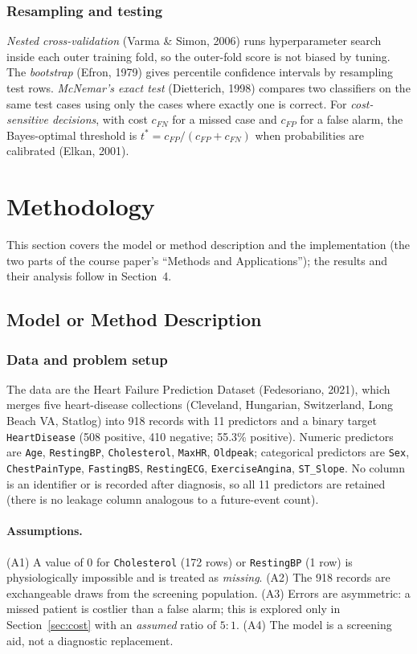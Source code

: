 \documentclass[12pt,a4paper]{article}
\newcommand{\code}[1]{\texttt{\small #1}}
\begin{document}
\subsubsection{Resampling and testing}
\emph{Nested cross-validation} (Varma \& Simon, 2006) runs hyperparameter search inside each outer training fold, so the outer-fold score is not biased by tuning. The \emph{bootstrap} (Efron, 1979) gives percentile confidence intervals by resampling test rows. \emph{McNemar's exact test} (Dietterich, 1998) compares two classifiers on the same test cases using only the cases where exactly one is correct. For \emph{cost-sensitive decisions}, with cost $c_{FN}$ for a missed case and $c_{FP}$ for a false alarm, the Bayes-optimal threshold is $t^\ast=c_{FP}/(c_{FP}+c_{FN})$ when probabilities are calibrated (Elkan, 2001).

\section{Methodology}
This section covers the model or method description and the implementation (the two parts of the course paper's ``Methods and Applications''); the results and their analysis follow in Section~4.
\subsection{Model or Method Description}
\subsubsection{Data and problem setup}
The data are the Heart Failure Prediction Dataset (Fedesoriano, 2021), which merges five heart-disease collections (Cleveland, Hungarian, Switzerland, Long Beach VA, Statlog) into 918 records with 11 predictors and a binary target \code{HeartDisease} (508 positive, 410 negative; 55.3\% positive). Numeric predictors are \code{Age}, \code{RestingBP}, \code{Cholesterol}, \code{MaxHR}, \code{Oldpeak}; categorical predictors are \code{Sex}, \code{ChestPainType}, \code{FastingBS}, \code{RestingECG}, \code{ExerciseAngina}, \code{ST\_Slope}. No column is an identifier or is recorded after diagnosis, so all 11 predictors are retained (there is no leakage column analogous to a future-event count).

\paragraph{Assumptions.} (A1) A value of $0$ for \code{Cholesterol} (172 rows) or \code{RestingBP} (1 row) is physiologically impossible and is treated as \emph{missing}. (A2) The 918 records are exchangeable draws from the screening population. (A3) Errors are asymmetric: a missed patient is costlier than a false alarm; this is explored only in Section~\ref{sec:cost} with an \emph{assumed} ratio of $5{:}1$. (A4) The model is a screening aid, not a diagnostic replacement.
\end{document}
